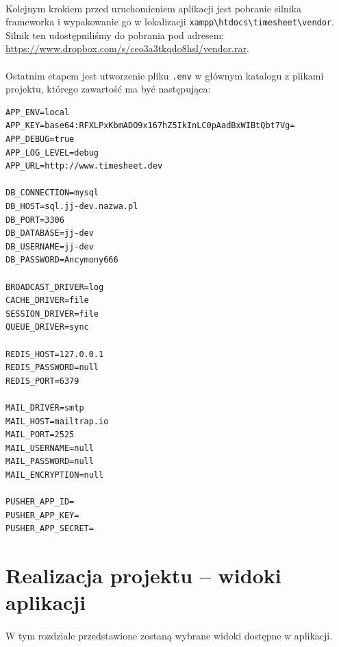 \documentclass[a4paper, 12pt, oneside]{article}
\begin{document}
			\paragraph{}Kolejnym krokiem przed uruchomieniem aplikacji jest pobranie silnika frameworka i wypakowanie go w lokalizacji \verb+xampp\htdocs\timesheet\vendor+. Silnik ten udostępniliśmy do pobrania pod adresem: \url{https://www.dropbox.com/s/ceo3a3tkqdo8hsl/vendor.rar}.
			
			\paragraph{}Ostatnim etapem jest utworzenie pliku \verb+.env+ w głównym katalogu z plikami projektu, którego zawartość ma być następująca:\\
			
			\begin{footnotesize}
				\begin{lstlisting}[frame=single]  
APP_ENV=local
APP_KEY=base64:RFXLPxKbmADO9x167hZ5IkInLC0pAadBxWIBtQbt7Vg=
APP_DEBUG=true
APP_LOG_LEVEL=debug
APP_URL=http://www.timesheet.dev

DB_CONNECTION=mysql
DB_HOST=sql.jj-dev.nazwa.pl
DB_PORT=3306
DB_DATABASE=jj-dev
DB_USERNAME=jj-dev
DB_PASSWORD=Ancymony666

BROADCAST_DRIVER=log
CACHE_DRIVER=file
SESSION_DRIVER=file
QUEUE_DRIVER=sync

REDIS_HOST=127.0.0.1
REDIS_PASSWORD=null
REDIS_PORT=6379

MAIL_DRIVER=smtp
MAIL_HOST=mailtrap.io
MAIL_PORT=2525
MAIL_USERNAME=null
MAIL_PASSWORD=null
MAIL_ENCRYPTION=null

PUSHER_APP_ID=
PUSHER_APP_KEY=
PUSHER_APP_SECRET=
\end{lstlisting}
\end{footnotesize}
						
			
\section{Realizacja projektu -- widoki aplikacji}
	\paragraph{}W tym rozdziale przedstawione zostaną wybrane widoki dostępne w aplikacji.
\end{document}
